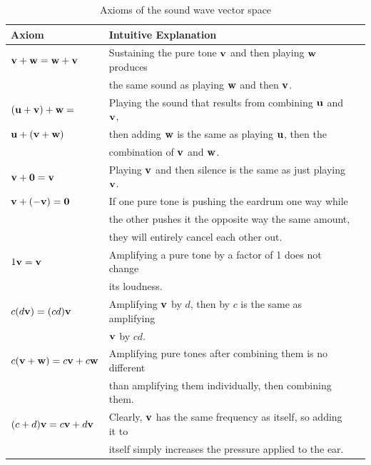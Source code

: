 \begin{table}[!h]
    \centering
    \begin{tabular}{|l|l|l|}
        \hline
        Axiom & Intuitive Explanation\\
        \hline
        $\mathbf{v}+\mathbf{w} = \mathbf{w}+\mathbf{v}$ & Sustaining the pure tone $\mathbf{v}$ and then playing $\mathbf{w}$ produces \\& the same sound as playing $\mathbf{w}$ and then $\mathbf{v}$. \\
        \hline
        $(\mathbf{u}+\mathbf{v})+\mathbf{w} =$  & Playing the sound that results from combining $\mathbf{u}$ and $\mathbf{v}$, \\ $\mathbf{u}+(\mathbf{v}+\mathbf{w})$ & then adding $\mathbf{w}$ is the same as playing $\mathbf{u}$, then the \\& combination of $\mathbf{v}$ and $\mathbf{w}$.\\
        \hline
        $\mathbf{v}+\mathbf{0} = \mathbf{v}$ & Playing $\mathbf{v}$ and then silence is the same as just playing $\mathbf{v}$.\\
        \hline
        $\mathbf{v}+(-\mathbf{v}) = \mathbf{0}$ & If one pure tone is pushing the eardrum one way while \\& the other pushes it the opposite way the same amount, \\& they will entirely cancel each other out.\\
        \hline
        $1\mathbf{v} = \mathbf{v}$ & Amplifying a pure tone by a factor of 1 does not change \\& its loudness.\\
        \hline
        $c(d\mathbf{v}) = (cd)\mathbf{v}$ & Amplifying $\mathbf{v}$ by $d$, then by $c$ is the same as amplifying \\& $\mathbf{v}$ by $cd$.\\
        \hline
        $c(\mathbf{v}+\mathbf{w}) = c\mathbf{v}+c\mathbf{w}$ & Amplifying pure tones after combining them is no different \\& than amplifying them individually, then combining them.\\
        \hline
        $(c+d)\mathbf{v} = c\mathbf{v}+d\mathbf{v}$ & Clearly, $\mathbf{v}$ has the same frequency as itself, so adding it to \\& itself  simply increases the pressure applied to the ear.\\
        \hline
    \end{tabular}
    \caption{Axioms of the sound wave vector space}
    \label{tab:axioms}
\end{table}

\newpage

